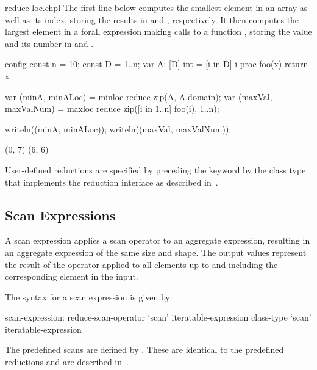 \begin{chapelexample}{reduce-loc.chpl}
The first line below computes the smallest element in an array
 as well as its index, storing the results in  and
, respectively.  It then computes the largest element in
a forall expression making calls to a function , storing
the value and its number in  and .
\begin{chapelnoprint}
config const n = 10;
const D = {1..n};
var A: [D] int = [i in D] i %
proc foo(x) return x %
\end{chapelnoprint}
\begin{chapel}
var (minA, minALoc) = minloc reduce zip(A, A.domain); 
var (maxVal, maxValNum) = maxloc reduce zip([i in 1..n] foo(i), 1..n);
\end{chapel}
\begin{chapelnoprint}
writeln((minA, minALoc));
writeln((maxVal, maxValNum));
\end{chapelnoprint}
\begin{chapeloutput}
(0, 7)
(6, 6)
\end{chapeloutput}
\end{chapelexample}

User-defined reductions are specified by preceding the
keyword  by the class type that implements the reduction
interface as described in~.

\subsection{Scan Expressions}
\label{scan}

A scan expression applies a scan operator to an aggregate expression,
resulting in an aggregate expression of the same size and shape.  The
output values represent the result of the operator applied to all
elements up to and including the corresponding element in the input.

The syntax for a scan expression is given by:
\begin{syntax}
scan-expression:
  reduce-scan-operator `scan' iteratable-expression
  class-type `scan' iteratable-expression
\end{syntax}

The predefined scans are defined by .  These
are identical to the predefined reductions and are described
in~.

